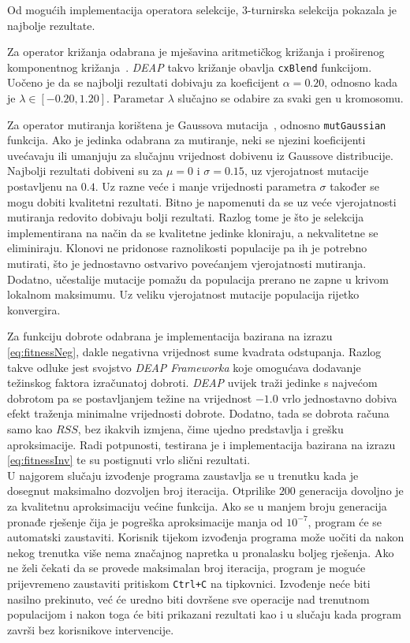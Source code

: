 \documentclass[times, utf8, seminar, numeric]{fer}
\begin{document}
Od mogućih implementacija operatora selekcije, $3$-turnirska selekcija pokazala je najbolje rezultate.

Za operator križanja odabrana je mješavina aritmetičkog križanja i proširenog komponentnog križanja~\cite{Cupic}.
\textit{DEAP} takvo križanje obavlja \texttt{cxBlend} funkcijom.
Uočeno je da se najbolji rezultati dobivaju za koeficijent $\alpha = 0.20$, odnosno kada je $\lambda \in \left[ -0.20, 1.20 \right]$.
Parametar $\lambda$ slučajno se odabire za svaki gen u kromosomu.

Za operator mutiranja korištena je Gaussova mutacija~\cite{WikiMutation}, odnosno \texttt{mutGaussian} funkcija.
Ako je jedinka odabrana za mutiranje, neki se njezini koeficijenti uvećavaju ili umanjuju za slučajnu vrijednost dobivenu iz Gaussove distribucije.
Najbolji rezultati dobiveni su za $\mu = 0$ i $\sigma = 0.15$, uz vjerojatnost mutacije postavljenu na $0.4$.
Uz razne veće i manje vrijednosti parametra $\sigma$ također se mogu dobiti kvalitetni rezultati.
Bitno je napomenuti da se uz veće vjerojatnosti mutiranja redovito dobivaju bolji rezultati.
Razlog tome je što je selekcija implementirana na način da se kvalitetne jedinke kloniraju, a nekvalitetne se eliminiraju.
Klonovi ne pridonose raznolikosti populacije pa ih je potrebno mutirati, što je jednostavno ostvarivo povećanjem vjerojatnosti mutiranja.
Dodatno, učestalije mutacije pomažu da populacija prerano ne zapne u krivom lokalnom maksimumu.
Uz veliku vjerojatnost mutacije populacija rijetko konvergira.

Za funkciju dobrote odabrana je implementacija bazirana na izrazu \eqref{eq:fitnessNeg}, dakle negativna vrijednost sume kvadrata odstupanja.
Razlog takve odluke jest svojstvo \textit{DEAP Frameworka} koje omogućava dodavanje težinskog faktora izračunatoj dobroti.
\textit{DEAP} uvijek traži jedinke s najvećom dobrotom pa se postavljanjem težine na vrijednost $-1.0$ vrlo jednostavno dobiva efekt traženja minimalne vrijednosti dobrote.
Dodatno, tada se dobrota računa samo kao $RSS$, bez ikakvih izmjena, čime ujedno predstavlja i grešku aproksimacije.
Radi potpunosti, testirana je i implementacija bazirana na izrazu \eqref{eq:fitnessInv} te su postignuti vrlo slični rezultati.\\

U najgorem slučaju izvođenje programa zaustavlja se u trenutku kada je dosegnut maksimalno dozvoljen broj iteracija.
Otprilike $200$ generacija dovoljno je za kvalitetnu aproksimaciju većine funkcija.
Ako se u manjem broju generacija pronađe rješenje čija je pogreška aproksimacije manja od $10^{-7}$, program će se automatski zaustaviti.
Korisnik tijekom izvođenja programa može uočiti da nakon nekog trenutka više nema značajnog napretka u pronalasku boljeg rješenja.
Ako ne želi čekati da se provede maksimalan broj iteracija, program je moguće prijevremeno zaustaviti pritiskom \texttt{Ctrl+C} na tipkovnici.
Izvođenje neće biti nasilno prekinuto, već će uredno biti dovršene sve operacije nad trenutnom populacijom i nakon toga će biti prikazani rezultati kao i u slučaju kada program završi bez korisnikove intervencije.
\end{document}
